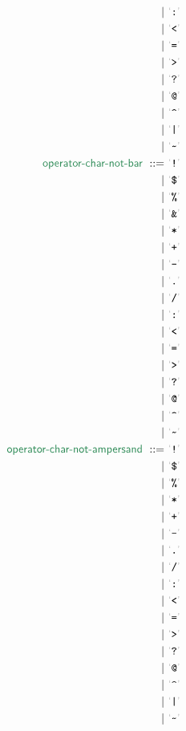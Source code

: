 \begin{align*}
      ~ \mid ~ &  \LEX{:{}} \\
      ~ \mid ~ &  \LEX{<{}} \\
      ~ \mid ~ &  \LEX{={}} \\
      ~ \mid ~ &  \LEX{>{}} \\
      ~ \mid ~ &  \LEX{?{}} \\
      ~ \mid ~ &  \LEX{@{}} \\
      ~ \mid ~ &  \LEX{\CARET } \\
      ~ \mid ~ &  \LEX{|} \\
      ~ \mid ~ &  \LEX{\TILDE }
    \\
     \SYN{operator-char-not-bar}
      ~ ::= ~ &
      \LEX{!{}} \\
      ~ \mid ~ &  \LEX{\DOLLAR } \\
      ~ \mid ~ &  \LEX{\PERCENT } \\
      ~ \mid ~ &  \LEX{\AMPERSAND } \\
      ~ \mid ~ &  \LEX{*{}} \\
      ~ \mid ~ &  \LEX{+{}} \\
      ~ \mid ~ &  \LEX{-{}} \\
      ~ \mid ~ &  \LEX{.{}} \\
      ~ \mid ~ &  \LEX{/{}} \\
      ~ \mid ~ &  \LEX{:{}} \\
      ~ \mid ~ &  \LEX{<{}} \\
      ~ \mid ~ &  \LEX{={}} \\
      ~ \mid ~ &  \LEX{>{}} \\
      ~ \mid ~ &  \LEX{?{}} \\
      ~ \mid ~ &  \LEX{@{}} \\
      ~ \mid ~ &  \LEX{\CARET } \\
      ~ \mid ~ &  \LEX{\TILDE }
    \\
     \SYN{operator-char-not-ampersand}
      ~ ::= ~ &
      \LEX{!{}} \\
      ~ \mid ~ &  \LEX{\DOLLAR } \\
      ~ \mid ~ &  \LEX{\PERCENT } \\
      ~ \mid ~ &  \LEX{*{}} \\
      ~ \mid ~ &  \LEX{+{}} \\
      ~ \mid ~ &  \LEX{-{}} \\
      ~ \mid ~ &  \LEX{.{}} \\
      ~ \mid ~ &  \LEX{/{}} \\
      ~ \mid ~ &  \LEX{:{}} \\
      ~ \mid ~ &  \LEX{<{}} \\
      ~ \mid ~ &  \LEX{={}} \\
      ~ \mid ~ &  \LEX{>{}} \\
      ~ \mid ~ &  \LEX{?{}} \\
      ~ \mid ~ &  \LEX{@{}} \\
      ~ \mid ~ &  \LEX{\CARET } \\
      ~ \mid ~ &  \LEX{|} \\
      ~ \mid ~ &  \LEX{\TILDE }
\end{align*}

